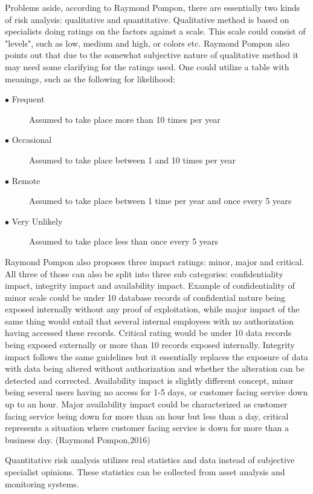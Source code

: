 \documentclass{article}
\begin{document}
\par
Problems aside, according to Raymond Pompon, there are essentially two kinds of risk analysis: qualitative and quantitative. Qualitative method is based on specialists doing ratings on the factors against a scale. This scale could consist of "levels", such as low, medium and high, or colors etc.
Raymond Pompon also points out that due to the somewhat subjective nature of qualitative method it may need some clarifying for the ratings used. One could utilize a table with meanings, such as the following for likelihood:
\begin{description}
	\item[$\bullet$ Frequent] Assumed to take place more than 10 times per year
	\item[$\bullet$ Occasional]Assumed to take place between 1 and 10 times per year
	\item[$\bullet$ Remote] Assumed to take place between 1 time per year and once every 5 years
	\item[$\bullet$ Very Unlikely] Assumed to take place less than once every 5 years
\end{description}
Raymond Pompon also proposes three impact ratings: minor, major and critical. All three of those can also be split into three sub categories: confidentiality impact, integrity impact and availability impact.
Example of confidentiality of minor scale could be under 10 database records of confidential nature being exposed internally without any proof of exploitation, while major impact of the same thing would entail that several internal employees with no authorization having accessed these records. Critical rating would be under 10 data records being exposed externally or more than 10 records exposed internally. Integrity impact follows the same guidelines but it essentially replaces the exposure of data with data being altered without authorization and whether the alteration can be detected and corrected. Availability impact is slightly different concept, minor being several users having no access for 1-5 days, or customer facing service down up to an hour. Major availability impact could be characterized as customer facing service being down for more than an hour but less than a day, critical represents a situation where customer facing service is down for more than a business day. (Raymond Pompon,2016) 
\par
Quantitative risk analysis utilizes real statistics and data instead of subjective specialist opinions. These statistics can be collected from asset analysis and monitoring systems.
\end{document}
